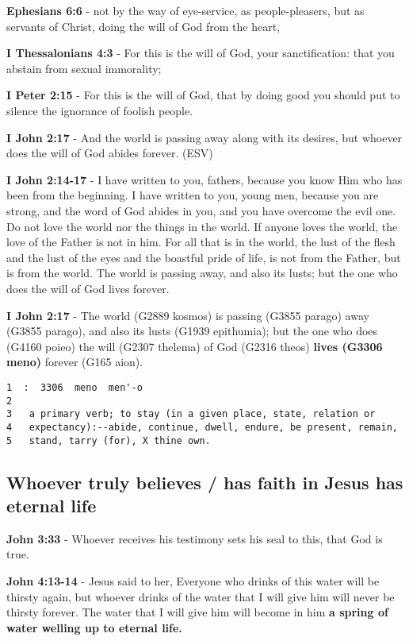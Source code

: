 \documentclass[11pt]{article}
\begin{document}
\textbf{Ephesians 6:6} - not by the way of eye-service, as people-pleasers, but as servants of Christ, doing the will of God from the heart,

\textbf{I Thessalonians 4:3} - For this is the will of God, your sanctification: that you abstain from sexual immorality;

\textbf{I Peter 2:15} - For this is the will of God, that by doing good you should put to silence the ignorance of foolish people.

\textbf{I John 2:17} - And the world is passing away along with its desires, but whoever does the will of God abides forever. (ESV)

\textbf{I John 2:14-17} - I have written to you, fathers, because you know Him who has been from the beginning. I have written to you, young men, because you are strong, and the word of God abides in you, and you have overcome the evil one.  Do not love the world nor the things in the world. If anyone loves the world, the love of the Father is not in him.  For all that is in the world, the lust of the flesh and the lust of the eyes and the boastful pride of life, is not from the Father, but is from the world.  The world is passing away, and also its lusts; but the one who does the will of God lives forever.

\textbf{I John 2:17} - The world (G2889 kosmos) is passing (G3855 parago) away (G3855 parago), and also its lusts (G1939 epithumia); but the one who does (G4160 poieo) the will (G2307 thelema) of God (G2316 theos) \textbf{lives (G3306 meno)} forever (G165 aion).

\begin{verbatim}
1  :  3306  meno  men'-o
2  
3   a primary verb; to stay (in a given place, state, relation or
4   expectancy):--abide, continue, dwell, endure, be present, remain,
5   stand, tarry (for), X thine own.
\end{verbatim}

\subsection{Whoever truly believes / has faith in Jesus has eternal life}
\label{sec:org5020359}
\textbf{John 3:33} - Whoever receives his testimony sets his seal to this, that God is true.

\textbf{John 4:13-14} - Jesus said to her, Everyone who drinks of this water will be thirsty again, but whoever drinks of the water that I will give him will never be thirsty forever. The water that I will give him will become in him \textbf{a spring of water welling up to eternal life.}
\end{document}
